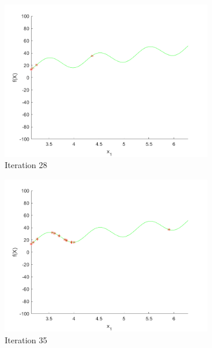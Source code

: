 \begin{figure}
\begin{subfigure}[b]{0.4\textwidth}
   \includegraphics[width=\textwidth]{img/smpl/rast1dshft/loa-iter-28}
   \caption{Iteration 28}
   \label{fig:i1-iter-4}
 \end{subfigure}
 \begin{subfigure}[b]{0.4\textwidth}
   \includegraphics[width=\textwidth]{img/smpl/rast1dshft/loa-iter-35}
   \caption{Iteration 35}
   \label{fig:i1-iter-5}
 \end{subfigure}
 \begin{subfigure}[b]{0.4\textwidth}

\end{subfigure}
\end{figure}
